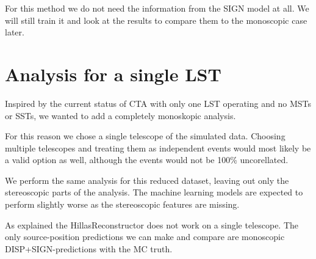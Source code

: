 For this method we do not need the information from the SIGN model at all.
We will still train it and look at the results to compare them to 
the monoscopic case later.


\section{Analysis for a single LST}
Inspired by the current status of CTA with only one LST operating and no MSTs or SSTs,
we wanted to add a completely monoskopic analysis.

For this reason we chose a single telescope of the simulated data.
Choosing multiple telescopes and treating them as independent events 
would most likely be a valid option as well, although the 
events would not be 100\% uncorellated.

We perform the same analysis for this reduced dataset, leaving out only 
the stereoscopic parts of the analysis.
The machine learning models are expected 
to perform slightly worse as the stereoscopic features are missing.

As explained the HillasReconstructor does not work on a single telescope.
The only source-position predictions we can make and compare are monoscopic 
DISP+SIGN-predictions with the MC truth.
